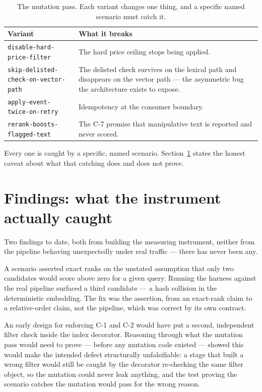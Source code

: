 \documentclass[11pt,a4paper]{article}
\newcommand{\finding}[1]{{\color{primaryblue}\textbf{#1}}}
\begin{document}
\begin{table}[htbp]
\centering
\caption{The mutation pass. Each variant changes one thing, and a specific
named scenario must catch it.}
\begin{tabularx}{\linewidth}{@{}lX@{}}
\toprule
\textbf{Variant} & \textbf{What it breaks} \\
\midrule
\texttt{disable-hard-price-filter} & The hard price ceiling stops being applied. \\
\texttt{skip-delisted-check-on-vector-path} & The delisted check survives on the lexical path and disappears on the vector path --- the asymmetric bug the architecture exists to expose. \\
\texttt{apply-event-twice-on-retry} & Idempotency at the consumer boundary. \\
\texttt{rerank-boosts-flagged-text} & The C-7 promise that manipulative text is reported and never scored. \\
\bottomrule
\end{tabularx}
\end{table}

Every one is caught by a specific, named scenario. Section~\ref{sec:findings}
states the honest caveat about what that catching does and does not prove.

\section{Findings: what the instrument actually caught}
\label{sec:findings}

Two findings to date, both from building the measuring instrument, neither
from the pipeline behaving unexpectedly under real traffic --- there has never
been any.

\vspace{0.2cm}
\noindent\finding{F-1.} A scenario asserted exact ranks on the unstated
assumption that only two candidates would score above zero for a given query.
Running the harness against the real pipeline surfaced a third candidate --- a
hash collision in the deterministic embedding. The fix was the assertion, from
an exact-rank claim to a relative-order claim, not the pipeline, which was
correct by its own contract.

\vspace{0.2cm}
\noindent\finding{F-2.} An early design for enforcing C-1 and C-2 would have
put a second, independent filter check inside the index decorator. Reasoning
through what the mutation pass would need to prove --- before any mutation
code existed --- showed this would make the intended defect structurally
unfalsifiable: a stage that built a wrong filter would still be caught by the
decorator re-checking the same filter object, so the mutation could never leak
anything, and the test proving the scenario catches the mutation would pass
for the wrong reason.
\end{document}
